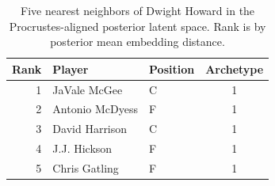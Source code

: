 \begin{table}[htbp]
  \centering\small
  \begin{tabular}{rllc}
    \toprule
    Rank & Player & Position & Archetype \\
    \midrule
    1 & JaVale McGee & C & 1 \\
    2 & Antonio McDyess & F & 1 \\
    3 & David Harrison & C & 1 \\
    4 & J.J. Hickson & F & 1 \\
    5 & Chris Gatling & F & 1 \\
    \bottomrule
  \end{tabular}
  \caption{Five nearest neighbors of Dwight Howard in the Procrustes-aligned posterior latent space. Rank is by posterior mean embedding distance.}
  \label{tab:Dwight_Howard_neighbors}
\end{table}

